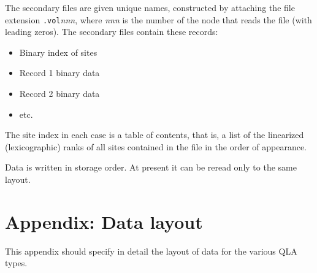 \documentclass{article}
\begin{document}
The secondary files are given unique names, constructed by attaching
the file extension {\tt .vol}{\it nnn}, where {\it nnn} is the number
of the node that reads the file (with leading zeros).  The secondary
files contain these records:

\begin{itemize}
  \item Binary index of sites
  \item Record 1 binary data
  \item Record 2 binary data
  \item etc.
\end{itemize}

The site index in each case is a table of contents, that is, a list of
the linearized (lexicographic) ranks of all sites contained in the
file in the order of appearance.

Data is written in storage order.  At present it can be reread only to
the same layout.

\section{Appendix: Data layout}

This appendix should specify in detail the layout of data for the
various QLA types.
\end{document}
